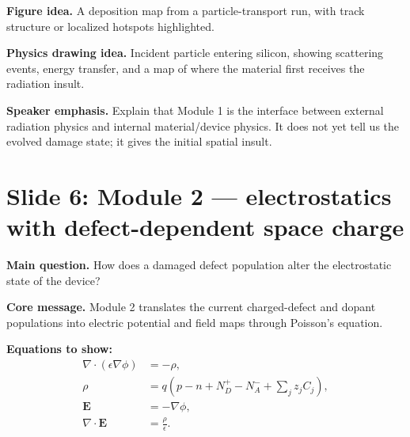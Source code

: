 \documentclass[11pt]{article}
\begin{document}
\textbf{Figure idea.} A deposition map from a particle-transport run, with track structure or localized hotspots highlighted.

\textbf{Physics drawing idea.} Incident particle entering silicon, showing scattering events, energy transfer, and a map of where the material first receives the radiation insult.

\textbf{Speaker emphasis.} Explain that Module 1 is the interface between external radiation physics and internal material/device physics. It does not yet tell us the evolved damage state; it gives the initial spatial insult.

\section{Slide 6: Module 2 --- electrostatics with defect-dependent space charge}
\begin{physicsbox}
\textbf{Main question.} How does a damaged defect population alter the electrostatic state of the device?
\end{physicsbox}

\textbf{Core message.} Module 2 translates the current charged-defect and dopant populations into electric potential and field maps through Poisson's equation.

\textbf{Equations to show:}
\begin{align*}
\nabla\cdot(\epsilon\nabla\phi) &= -\rho,\\
\rho &= q\left(p-n+N_D^+-N_A^-+\sum_j z_j C_j\right),\\
\bm{E} &= -\nabla\phi,\\
\nabla\cdot\bm{E} &= \frac{\rho}{\epsilon}.
\end{align*}
\end{document}
